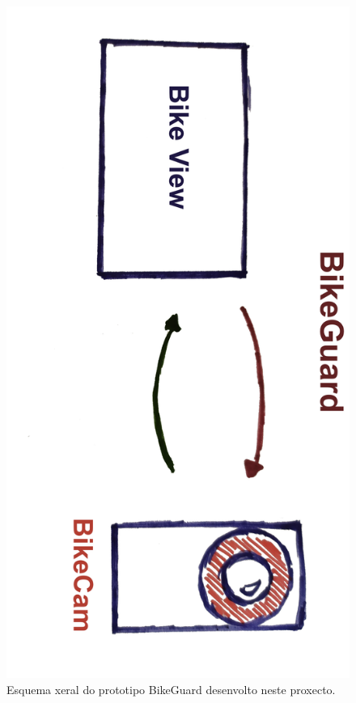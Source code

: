 \begin{figure}[tbp]
  \centering
  \includegraphics[scale=0.1]{imaxes/bikeguard.jpg}
  \caption{Esquema xeral do prototipo BikeGuard desenvolto neste proxecto.}
  \label{fig:bikeguard}
\end{figure}

